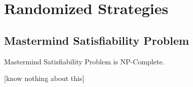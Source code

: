 \chapter{Randomized Strategies}

\section{Mastermind Satisfiability Problem}

Mastermind Satisfiability Problem is NP-Complete.

[know nothing about this]